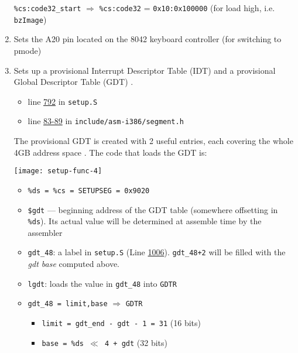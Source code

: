 \begin{enumerate}
  \texttt{\%cs:code32\_start} $\Rightarrow$ \texttt{\%cs:code32} = \texttt{0x10:0x100000} (for
  load high, i.e. \texttt{bzImage})
\item Sets the A20 pin  located on the 8042 keyboard controller (for
  switching to pmode)
\item Sets up a provisional Interrupt Descriptor Table (IDT)  and a
  provisional Global Descriptor Table (GDT) .
  \begin{itemize}
  \item line \href{http://lxr.linux.no/linux+v2.6.11/arch/i386/boot/setup.S\#L792}{792} in
      \texttt{setup.S}
  \item line \href{http://lxr.linux.no/linux+v2.6.11/include/asm-i386/segment.h\#L83}{83-89}
      in \texttt{include/asm-i386/segment.h}
  \end{itemize}
  The provisional GDT is created with 2 useful entries, each covering the whole 4GB
  address space . The code that
  loads the GDT is:    
  \begin{center}
    \texttt{[image: setup-func-4]}
  \end{center}

  \begin{itemize}
  \item \texttt{\%ds = \%cs = SETUPSEG = 0x9020}
  \item \texttt{\$gdt} --- beginning address of the GDT table (somewhere offsetting in
    \texttt{\%ds}). Its actual value will be determined at assemble time by the assembler
  \item \texttt{gdt\_48}: a label in \texttt{setup.S} (Line
    \href{http://lxr.linux.no/linux+v2.6.11/arch/i386/boot/setup.S\#L1006}{1006}). \texttt{gdt\_48+2}
    will be filled with the \emph{gdt base} computed above.
  \item \texttt{lgdt}: loads the value in \texttt{gdt\_48} into \texttt{GDTR}
  \item \texttt{gdt\_48 = limit,base} $\Rightarrow$ \texttt{GDTR}
    \begin{itemize}
    \item \texttt{limit = gdt\_end - gdt - 1 = 31} (16 bits)
    \item \texttt{base = \%ds $\ll$ 4 + gdt} (32 bits)
    \end{itemize}
  \end{itemize}


\end{enumerate}
